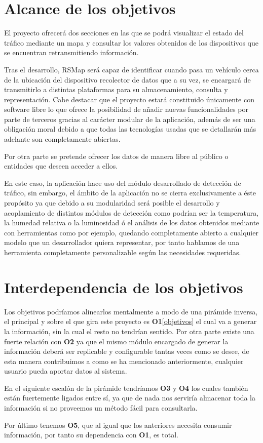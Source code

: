 \section{Alcance de los objetivos}

El proyecto ofrecerá dos secciones en las que se podrá visualizar el estado del tráfico mediante un mapa y consultar los valores obtenidos de los dispositivos que se encuentran retransmitiendo información.

\bigskip
Tras el desarrollo, RSMap será capaz de identificar cuando pasa un vehículo cerca de la ubicación del dispositivo recolector de datos que a su vez, se encargará de transmitirlo a distintas plataformas para su almacenamiento, consulta y representación. Cabe destacar que el proyecto estará constituido únicamente con software libre lo que ofrece la posibilidad de añadir nuevas funcionalidades por parte de terceros gracias al carácter modular de la aplicación, además de ser una obligación moral debido a que todas las tecnologías usadas que se detallarán más adelante son completamente abiertas.

Por otra parte se pretende ofrecer los datos de manera libre al público o entidades que deseen acceder a ellos.

\bigskip
En este caso, la aplicación hace uso del módulo desarrollado de detección de tráfico, sin embargo, el ámbito de la aplicación no se cierra exclusivamente a éste propósito ya que debido a su modularidad será posible el desarrollo y acoplamiento de distintos módulos de detección como podrían ser la temperatura, la humedad relativa o la luminosidad ó el análisis de los datos obtenidos mediante con herramientas como  por ejemplo, quedando completamente abierto a cualquier modelo que un desarrollador quiera representar, por tanto hablamos de una herramienta completamente personalizable según las necesidades requeridas.


\section{Interdependencia de los objetivos}

Los objetivos podríamos alinearlos mentalmente a modo de una pirámide inversa, el principal y sobre el que gira este proyecto es \textbf{O1}\ref{objetivos} el cual va a generar la información, sin la cual el resto no tendrían sentido. Por otra parte existe una fuerte relación con \textbf{O2} ya que el mismo módulo encargado de generar la información deberá ser replicable y configurable tantas veces como se desee, de esta manera contribuimos a como se ha mencionado anteriormente, cualquier usuario pueda aportar datos al sistema.

En el siguiente escalón de la pirámide tendríamos \textbf{O3} y \textbf{O4} los cuales también están fuertemente ligados entre sí, ya que de nada nos serviría almacenar toda la información si no proveemos un método fácil para consultarla.

Por último tenemos \textbf{O5}, que al igual que los anteriores necesita consumir información, por tanto su dependencia con \textbf{O1}, es total.
